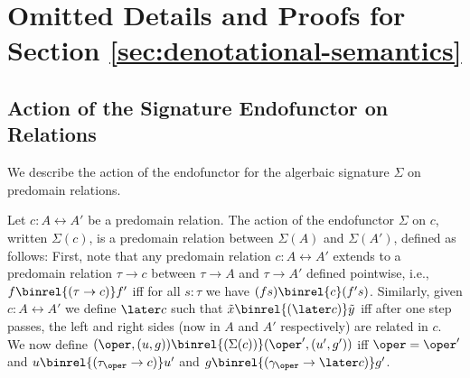 \section{Omitted Details and Proofs for Section \ref{sec:denotational-semantics}}

\subsection{Action of the Signature Endofunctor on Relations}

We describe the action of the endofunctor for the algerbaic signature $\Sigma$
on predomain relations.

Let $c : A \rel A'$ be a predomain relation. The action of the endofunctor
$\Sigma$ on $c$, written $\Sigma(c)$, is a predomain relation between
$\Sigma(A)$ and $\Sigma(A')$, defined as follows:
%
First, note that any predomain relation $c : A \rel A'$ extends to a predomain
relation $\tau \to c$ between $\tau \to A$ and $\tau \to A'$ defined pointwise,
i.e., $f \binrel{(\tau \to c)} f'$ iff for all $s : \tau$ we have $(f s)
\binrel{c} (f' s)$.
%
Similarly, given $c : A \rel A'$ we define $\later c$ such that $\tilde{x}
\binrel{(\later c)} \tilde{y}$ iff after one step passes, the left and right
sides (now in $A$ and $A'$ respectively) are related in $c$.
%
We now define $(\oper, (u, g)) \binrel{(\Sigma(c))} (\oper', (u', g'))$ iff
$\oper = \oper'$ and $u \binrel{(\tau_\oper \to c)} u'$ and 
$g \binrel{(\gamma_\oper \to \later c)} g'$.

